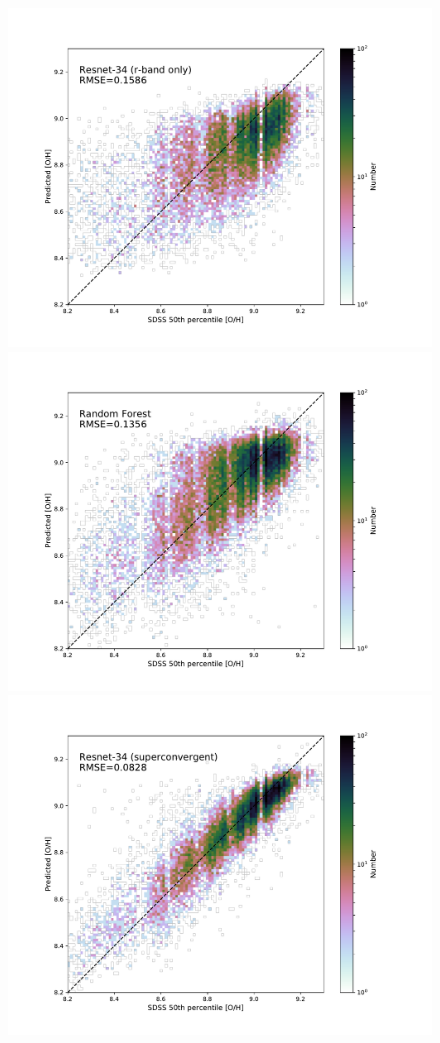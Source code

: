 \documentclass[fleqn,usenatbib]{mnras}
\begin{document}
\begin{figure}
	\includegraphics[width=\columnwidth]{r-band_pred-vs-SDSS.pdf}
	\includegraphics[width=\columnwidth]{random-forest_pred-vs-SDSS.pdf}
	\includegraphics[width=\columnwidth]{superconvergent-resnet34_pred-vs-SDSS.pdf}

\end{figure}
\end{document}
